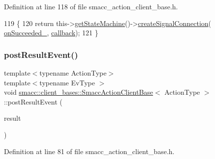 Definition at line 118 of file smacc\+\_\+action\+\_\+client\+\_\+base.\+h.


\begin{DoxyCode}
119     \{
120         \textcolor{keywordflow}{return} this->\hyperlink{classsmacc_1_1ISmaccClient_aec51d4712404cb9882b86e4c854bb93a}{getStateMachine}()->\hyperlink{classsmacc_1_1ISmaccStateMachine_adf0f42ade0c65cc471960fe2a7c42da2}{createSignalConnection}(
      \hyperlink{classsmacc_1_1client__bases_1_1SmaccActionClientBase_afa1d615e16c9e825d815a3a3ccaa61df}{onSucceeded\_}, \hyperlink{servers_2opencv__perception__node_2opencv__perception__node_8cpp_a050e697bd654facce10ea3f6549669b3}{callback});
121     \}
\end{DoxyCode}
\mbox{\label{classsmacc_1_1client__bases_1_1SmaccActionClientBase_ad84470e029cc996685f44ad0d4062c29}} 
\subsubsection{\texorpdfstring{post\+Result\+Event()}{postResultEvent()}}
{\footnotesize\ttfamily template$<$typename Action\+Type$>$ \\
template$<$typename Ev\+Type $>$ \\
void \hyperlink{classsmacc_1_1client__bases_1_1SmaccActionClientBase}{smacc\+::client\+\_\+bases\+::\+Smacc\+Action\+Client\+Base}$<$ Action\+Type $>$\+::post\+Result\+Event (\begin{DoxyParamCaption}\item[{Result\+Const\+Ptr}]{result }\end{DoxyParamCaption})\hspace{0.3cm}{\ttfamily [inline]}}



Definition at line 81 of file smacc\+\_\+action\+\_\+client\+\_\+base.\+h.



